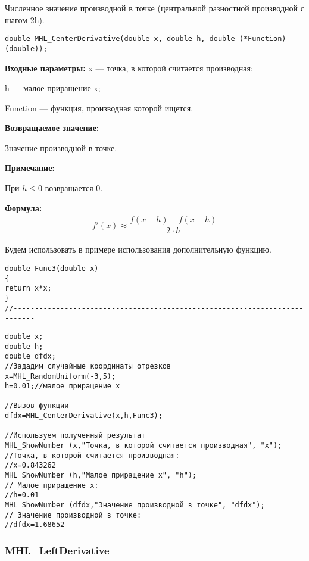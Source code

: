 \documentclass[a4paper,12pt]{article}
\begin{document}
Численное значение производной в точке (центральной разностной производной с шагом 2h).


\begin{lstlisting}[label=code_syntax_MHL_CenterDerivative,caption=Синтаксис]
double MHL_CenterDerivative(double x, double h, double (*Function)(double));
\end{lstlisting}

\textbf{Входные параметры:}
 x --- точка, в которой считается производная;
 
 h --- малое приращение x;
 
 Function --- функция, производная которой ищется.

\textbf{Возвращаемое значение:}
 
 Значение производной в точке.
 
 \textbf{Примечание:}
 
 При $h\leq0$ возвращается $0$.

\textbf{Формула:}
\begin{eqnarray*}
f'\left( x\right) \approx \dfrac{f\left( x+h\right)-f\left( x-h\right) }{2\cdot h}
\end{eqnarray*}

Будем использовать в примере использования дополнительную функцию.

\begin{lstlisting}[caption=Дополнительная функция]
double Func3(double x)
{
return x*x;
}
//---------------------------------------------------------------------------
\end{lstlisting}


\begin{lstlisting}[label=code_use_MHL_CenterDerivative,caption=Пример использования]
double x;
double h;
double dfdx;
//Зададим случайные координаты отрезков
x=MHL_RandomUniform(-3,5);
h=0.01;//малое приращение x

//Вызов функции
dfdx=MHL_CenterDerivative(x,h,Func3);

//Используем полученный результат
MHL_ShowNumber (x,"Точка, в которой считается производная", "x");
//Точка, в которой считается производная:
//x=0.843262
MHL_ShowNumber (h,"Малое приращение x", "h");
// Малое приращение x:
//h=0.01
MHL_ShowNumber (dfdx,"Значение производной в точке", "dfdx");
// Значение производной в точке:
//dfdx=1.68652
\end{lstlisting}

\subsubsection{MHL\_LeftDerivative}\label{MHL_LeftDerivative}
\end{document}
